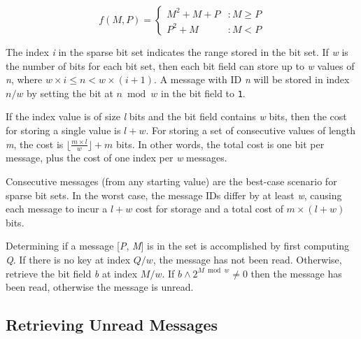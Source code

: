 \documentclass[lnicst]{svmultln}
\begin{document}
 \begin{equation}
   f(M,P) = \left\{
     \begin{array}{lr}
       M^{2} + M + P & : M \geq P \\
       P^{2} + M & : M < P
     \end{array}
   \right.
   \label{eq:elegantpairing}
\end{equation}

The index \textit{i} in the sparse bit set indicates the range stored in the bit set. If \textit{w} is the number of bits for each bit set, then each bit field can store up to \textit{w} values of \textit{n}, where $w \times i \leq n < w \times (i + 1)$. A message with ID \textit{n} will be stored in index $n/w$ by setting the bit at $n \bmod w$ in the bit field to \texttt{1}.

If the index value is of size \textit{l} bits and the bit field contains \textit{w} bits, then the cost for storing a single value is $l + w$. For storing a set of consecutive values of length \textit{m}, the cost is $\lfloor \frac{m \times l}{w} \rfloor + m$ bits. In other words, the total cost is one bit per message, plus the cost of one index per \textit{w} messages.

%

Consecutive messages (from any starting value) are the best-case scenario for sparse bit sets. In the worst case, the message IDs differ by at least \textit{w}, causing each message to incur a $l + w$ cost for storage and a total cost of $m \times (l + w)$ bits.

Determining if a message [\textit{P}, \textit{M}] is in the set is accomplished by first computing \textit{Q}. If there is no key at index $Q/w$, the message has not been read. Otherwise, retrieve the bit field \textit{b} at index $M / w$. If $b \wedge 2^{M \bmod w} \neq 0$ then the message has been read, otherwise the message is unread.
    
\subsection{Retrieving Unread Messages}
\end{document}
